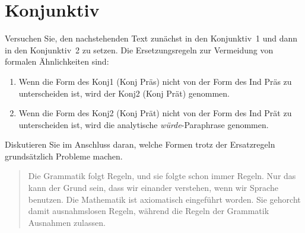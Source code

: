 \newpage

\section{Konjunktiv}

Versuchen Sie, den nachstehenden Text zunächst in den Konjunktiv~1 und dann in den Konjunktiv~2 zu setzen.
Die Ersetzungsregeln zur Vermeidung von formalen Ähnlichkeiten sind:

\begin{enumerate}\Lf
  \item Wenn die Form des Konj1 (Konj Präs) nicht von der Form des Ind Präs zu unterscheiden ist, wird der Konj2 (Konj Prät) genommen.
  \item Wenn die Form des Konj2 (Konj Prät) nicht von der Form des Ind Prät zu unterscheiden ist, wird die analytische \textit{würde}-Paraphrase genommen.
\end{enumerate}

Diskutieren Sie im Anschluss daran, welche Formen trotz der Ersatzregeln grundsätzlich Probleme machen.

\begin{quote}
  Die Grammatik folgt Regeln, und sie folgte schon immer Regeln.
  Nur das kann der Grund sein, dass wir einander verstehen, wenn wir Sprache benutzen.
  Die Mathematik ist axiomatisch eingeführt worden.
  Sie gehorcht damit ausnahmslosen Regeln, während die Regeln der Grammatik Ausnahmen zulassen.
\end{quote}



